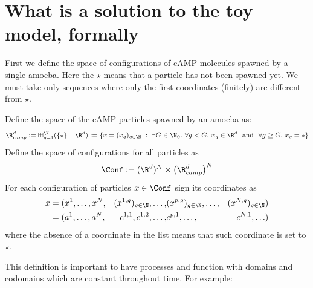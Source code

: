 \section{What is a solution to the toy model, formally}\label{app:formal-def-solution}

First we define the space of configurations of cAMP molecules spawned by a single amoeba.
Here the $\star$ means that a particle has not been spawned yet.
We must take only sequences where only the first coordinates (finitely) are different from $\star$.

\begin{definition}
Define the space of the cAMP particles spawned by an amoeba as:
\begin{equation}
\R^d_{camp}:=\boxplus_{g=1}^\N (\{\star\} \sqcup \R^d) := 
\{
	x = (x_g)_{g\in\N}\
	:\
	\exists G\in\N_0.\
	\forall g < G.\
	x_g \in \R^d\
	\text{ and }\
	\forall g\geq G.\
	x_g =\star
\}
\end{equation}
Define the space of configurations for all particles as
\begin{equation}
\Conf:=(\R^d)^N \times\big(\R^d_{camp}\big)^N
\end{equation}
For each configuration of particles $x\in \Conf$ sign its coordinates as 
\begin{equation*}
\begin{aligned}
x &= (x^1, \ldots, x^N, 
	&(x^{1,g})_{g\in\N}, \ldots, 
	&(x^{p,g})_{g\in\N}, \ldots, 
	&(x^{N,g})_{g\in\N})
\\
&= (a^1, \ldots, a^N, 
	&c^{1,1}, c^{1,2}, \ldots, 
	&c^{p,1},\ldots, 
	&c^{N,1}, \ldots)
\end{aligned}
\end{equation*}
where the absence of a coordinate in the list means that such coordinate is set to $\star$.
\end{definition}

This definition is important to have processes and function with domains and codomains which are constant throughout time.
For example:

